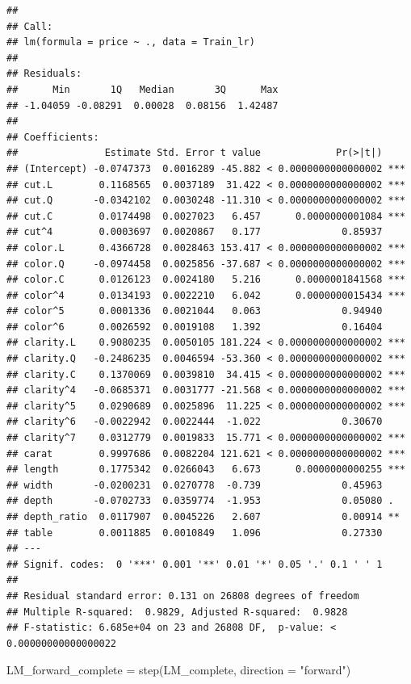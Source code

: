 \documentclass[
]{article}
\newenvironment{Shaded}{\begin{snugshade}}{\end{snugshade}}
\newcommand{\AttributeTok}[1]{\textcolor[rgb]{0.77,0.63,0.00}{#1}}
\newcommand{\FunctionTok}[1]{\textcolor[rgb]{0.00,0.00,0.00}{#1}}
\newcommand{\NormalTok}[1]{#1}
\newcommand{\OtherTok}[1]{\textcolor[rgb]{0.56,0.35,0.01}{#1}}
\newcommand{\StringTok}[1]{\textcolor[rgb]{0.31,0.60,0.02}{#1}}
\begin{document}
\begin{verbatim}
## 
## Call:
## lm(formula = price ~ ., data = Train_lr)
## 
## Residuals:
##      Min       1Q   Median       3Q      Max 
## -1.04059 -0.08291  0.00028  0.08156  1.42487 
## 
## Coefficients:
##               Estimate Std. Error t value             Pr(>|t|)    
## (Intercept) -0.0747373  0.0016289 -45.882 < 0.0000000000000002 ***
## cut.L        0.1168565  0.0037189  31.422 < 0.0000000000000002 ***
## cut.Q       -0.0342102  0.0030248 -11.310 < 0.0000000000000002 ***
## cut.C        0.0174498  0.0027023   6.457      0.0000000001084 ***
## cut^4        0.0003697  0.0020867   0.177              0.85937    
## color.L      0.4366728  0.0028463 153.417 < 0.0000000000000002 ***
## color.Q     -0.0974458  0.0025856 -37.687 < 0.0000000000000002 ***
## color.C      0.0126123  0.0024180   5.216      0.0000001841568 ***
## color^4      0.0134193  0.0022210   6.042      0.0000000015434 ***
## color^5      0.0001336  0.0021044   0.063              0.94940    
## color^6      0.0026592  0.0019108   1.392              0.16404    
## clarity.L    0.9080235  0.0050105 181.224 < 0.0000000000000002 ***
## clarity.Q   -0.2486235  0.0046594 -53.360 < 0.0000000000000002 ***
## clarity.C    0.1370069  0.0039810  34.415 < 0.0000000000000002 ***
## clarity^4   -0.0685371  0.0031777 -21.568 < 0.0000000000000002 ***
## clarity^5    0.0290689  0.0025896  11.225 < 0.0000000000000002 ***
## clarity^6   -0.0022942  0.0022444  -1.022              0.30670    
## clarity^7    0.0312779  0.0019833  15.771 < 0.0000000000000002 ***
## carat        0.9997686  0.0082204 121.621 < 0.0000000000000002 ***
## length       0.1775342  0.0266043   6.673      0.0000000000255 ***
## width       -0.0200231  0.0270778  -0.739              0.45963    
## depth       -0.0702733  0.0359774  -1.953              0.05080 .  
## depth_ratio  0.0117907  0.0045226   2.607              0.00914 ** 
## table        0.0011885  0.0010849   1.096              0.27330    
## ---
## Signif. codes:  0 '***' 0.001 '**' 0.01 '*' 0.05 '.' 0.1 ' ' 1
## 
## Residual standard error: 0.131 on 26808 degrees of freedom
## Multiple R-squared:  0.9829, Adjusted R-squared:  0.9828 
## F-statistic: 6.685e+04 on 23 and 26808 DF,  p-value: < 0.00000000000000022
\end{verbatim}

\begin{Shaded}
\begin{Highlighting}[]
\NormalTok{LM\_forward\_complete }\OtherTok{=} \FunctionTok{step}\NormalTok{(LM\_complete, }\AttributeTok{direction =} \StringTok{"forward"}\NormalTok{)}
\end{Highlighting}
\end{Shaded}
\end{document}
